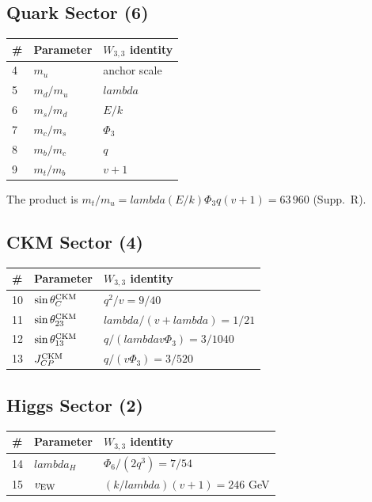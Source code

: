 \documentclass[12pt,a4paper]{article}
\def\lambda{lambda}%
\def\Phi#1{Phi#1}%
\theoremstyle{definition}
\begin{document}
\subsection*{Quark Sector (6)}
\begin{center}
\begin{tabular}{lll}
\toprule
\# & Parameter & $W_{3,3}$ identity \\
\midrule
4 & $m_u$ & anchor scale \\
5 & $m_d/m_u$ & $\lambda$ \\
6 & $m_s/m_d$ & $E/k$ \\
7 & $m_c/m_s$ & $\Phi_3$ \\
8 & $m_b/m_c$ & $q$ \\
9 & $m_t/m_b$ & $v+1$ \\
\bottomrule
\end{tabular}
\end{center}

The product is $\boxed{m_t/m_u = \lambda(E/k)\Phi_3 q (v+1) = 63\,960}$ (Supp.~R).

\subsection*{CKM Sector (4)}
\begin{center}
\begin{tabular}{lll}
\toprule
\# & Parameter & $W_{3,3}$ identity \\
\midrule
10 & $\sin\theta_C^{\rm CKM}$ & $q^2/v=9/40$ \\
11 & $\sin\theta_{23}^{\rm CKM}$ & $\lambda/(v+\lambda)=1/21$ \\
12 & $\sin\theta_{13}^{\rm CKM}$ & $q/(\lambda v\Phi_3)=3/1040$ \\
13 & $J_{CP}^{\rm CKM}$ & $q/(v\Phi_3)=3/520$ \\
\bottomrule
\end{tabular}
\end{center}

\subsection*{Higgs Sector (2)}
\begin{center}
\begin{tabular}{lll}
\toprule
\# & Parameter & $W_{3,3}$ identity \\
\midrule
14 & $\lambda_H$ & $\Phi_6/(2q^3)=7/54$ \\
15 & $v_{\rm EW}$ & $(k/\lambda)(v+1)=246$ GeV \\
\bottomrule
\end{tabular}
\end{center}
\end{document}
